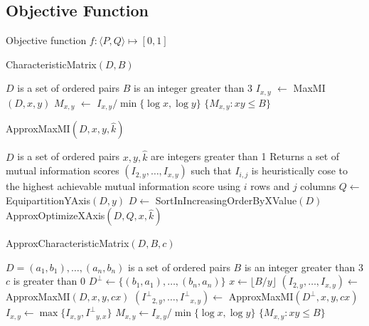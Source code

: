 \documentclass[12pt]{article}
\begin{document}
\subsection{Objective Function}
Objective function
$f:\langle P,Q \rangle \mapsto [0,1]$



\begin{algorithm}
\begin{algorithmic}[1]
\caption{CharacteristicMatrix$(D,B)$}
\label{CharacteristicMatrix}
\REQUIRE $D$ is a set of ordered pairs
\REQUIRE $B$ is an integer greater than 3
	\STATE $I_{x,y}$ $\gets$ MaxMI$(D,x,y)$
	\STATE $M_{x,y}$ $\gets$ $I_{x,y}/\min \{\log x, \log y\}$
\ENDFOR
\RETURN $\{M_{x,y}:xy\leq B\}$
\end{algorithmic}
\end{algorithm}

\begin{algorithm}
\begin{algorithmic}[1]
\caption{ApproxMaxMI$(D,x,y,\hat{k})$}
\label{ApproxMaxMI}
\REQUIRE $D$ is a set of ordered pairs
\REQUIRE $x,y,\hat{k}$ are integers greater than 1
\ENSURE Returns a set of mutual information scores $(I_{2,y},\ldots,I_{x,y})$ such that $I_{i,j}$ is heuristically cose to the highest achievable mutual information score using $i$ rows and $j$ columns
\STATE $Q \gets$ EquipartitionYAxis$(D,y)$
\STATE $D \gets$ SortInIncreasingOrderByXValue$(D)$
\RETURN ApproxOptimizeXAxis$(D,Q,x,\hat{k})$
\end{algorithmic}
\end{algorithm}

\begin{algorithm}
\begin{algorithmic}[1]
\caption{ApproxCharacteristicMatrix$(D,B,c)$}
\label{ApproxCharacteristicMatrix}
\REQUIRE $D={(a_1,b_1),\ldots,(a_n,b_n)}$ is a set of ordered pairs
\REQUIRE $B$ is an integer greater than 3
\REQUIRE $c$ is greater than 0
\STATE $D^{\perp} \gets \{(b_1,a_1),\ldots,(b_n,a_n)\}$
	\STATE $x \gets \lfloor B/y\rfloor$
	\STATE $(I_{2,y},\ldots ,I_{x,y}) \gets $ ApproxMaxMI$(D,x,y,cx)$
	\STATE $({I^{\perp}}_{2,y},\ldots ,{I^{\perp}}_{x,y}) \gets $ ApproxMaxMI$(D^{\perp},x,y,cx)$
\ENDFOR
{}
	\STATE $I_{x,y} \gets \max \{I_{x,y},{I^{\perp}}_{y,x}\}$
	\STATE $M_{x,y} \gets I_{x,y}/\min \{\log x, \log y\}$
\ENDFOR
\RETURN $\{M_{x,y}:xy\leq B\}$
\end{algorithmic}
\end{algorithm}
\end{document}
